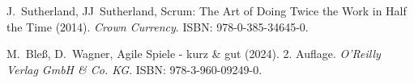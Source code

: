 \documentclass[5pt, final]{beamer}
\begin{document}
\begin{frame}[t]
\begin{multicols}{3}
\begin{thebibliography}{99}
                
                 J.~Sutherland, JJ~Sutherland, Scrum: The Art of Doing Twice the Work in Half the Time (2014). \textit{Crown Currency}. ISBN: 978-0-385-34645-0.
                
                 M.~Bleß, D.~Wagner, Agile Spiele - kurz \& gut (2024). 2. Auflage. \textit{O'Reilly Verlag GmbH \& Co. KG}. ISBN: 978-3-960-09249-0.
				
			\end{thebibliography}
			
		\end{multicols}
		
	\end{frame}
\end{document}

